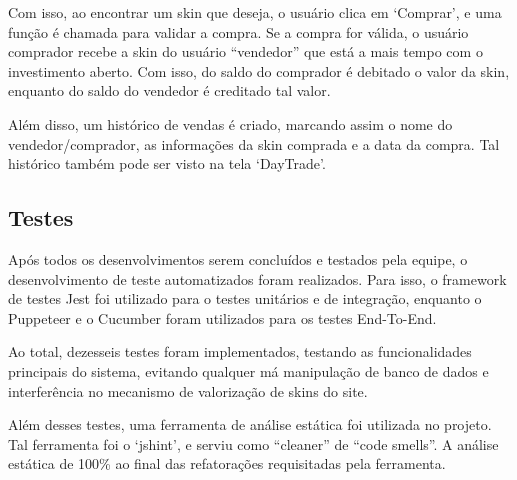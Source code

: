 Com isso, ao encontrar um skin que deseja, o usuário clica em ‘Comprar’, e uma função é 
chamada para validar a compra. Se a compra for válida, o usuário comprador recebe a skin 
do usuário “vendedor” que está a mais tempo com o investimento aberto. Com isso, do saldo do 
comprador é debitado o valor da skin, enquanto do saldo do vendedor é creditado tal valor. 

Além disso, um histórico de vendas é criado, marcando assim o nome do vendedor/comprador, as 
informações da skin comprada e a data da compra. Tal histórico também pode ser visto na tela 
‘DayTrade’.

\subsection{Testes}
Após todos os desenvolvimentos serem concluídos e testados pela equipe, o desenvolvimento de 
teste automatizados foram realizados. Para isso, o framework de testes Jest foi utilizado para 
o testes unitários e de integração, enquanto o Puppeteer e o Cucumber foram utilizados para os 
testes End-To-End. 

Ao total, dezesseis testes foram implementados, testando as funcionalidades principais do sistema, 
evitando qualquer má manipulação de banco de dados e interferência no mecanismo de valorização de
skins do site.

Além desses testes, uma ferramenta de análise estática foi utilizada no projeto. Tal ferramenta 
foi o ‘jshint’, e serviu como “cleaner” de “code smells”. A análise estática de 100\% ao final 
das refatorações requisitadas pela ferramenta.





